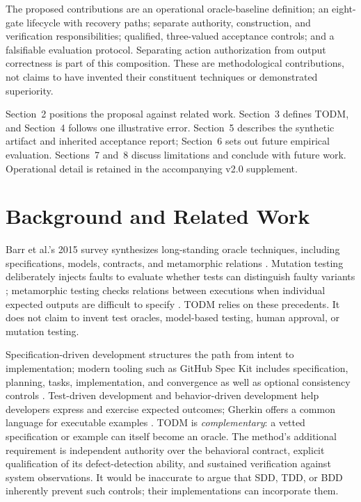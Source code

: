 \documentclass[11pt,a4paper]{article}
\newcommand{\todm}{\textsc{TODM}}
\begin{document}
The proposed contributions are an operational oracle-baseline definition; an eight-gate lifecycle with recovery paths; separate authority, construction, and verification responsibilities; qualified, three-valued acceptance controls; and a falsifiable evaluation protocol. Separating action authorization from output correctness is part of this composition. These are methodological contributions, not claims to have invented their constituent techniques or demonstrated superiority.

Section~2 positions the proposal against related work. Section~3 defines TODM, and Section~4 follows one illustrative error. Section~5 describes the synthetic artifact and inherited acceptance report; Section~6 sets out future empirical evaluation. Sections~7 and~8 discuss limitations and conclude with future work. Operational detail is retained in the accompanying v2.0 supplement.

\section{Background and Related Work}
Barr et al.'s 2015 survey synthesizes long-standing oracle techniques, including specifications, models, contracts, and metamorphic relations \cite{barr2015oracle}. Mutation testing deliberately injects faults to evaluate whether tests can distinguish faulty variants \cite{jia2011mutation}; metamorphic testing checks relations between executions when individual expected outputs are difficult to specify \cite{segura2016metamorphic}. \todm{} relies on these precedents. It does not claim to invent test oracles, model-based testing, human approval, or mutation testing.

Specification-driven development structures the path from intent to implementation; modern tooling such as GitHub Spec Kit includes specification, planning, tasks, implementation, and convergence as well as optional consistency controls \cite{github2026speckit}. Test-driven development and behavior-driven development help developers express and exercise expected outcomes; Gherkin offers a common language for executable examples \cite{cucumber2026}. \todm{} is \emph{complementary}: a vetted specification or example can itself become an oracle. The method's additional requirement is independent authority over the behavioral contract, explicit qualification of its defect-detection ability, and sustained verification against system observations. It would be inaccurate to argue that SDD, TDD, or BDD inherently prevent such controls; their implementations can incorporate them.
\end{document}
